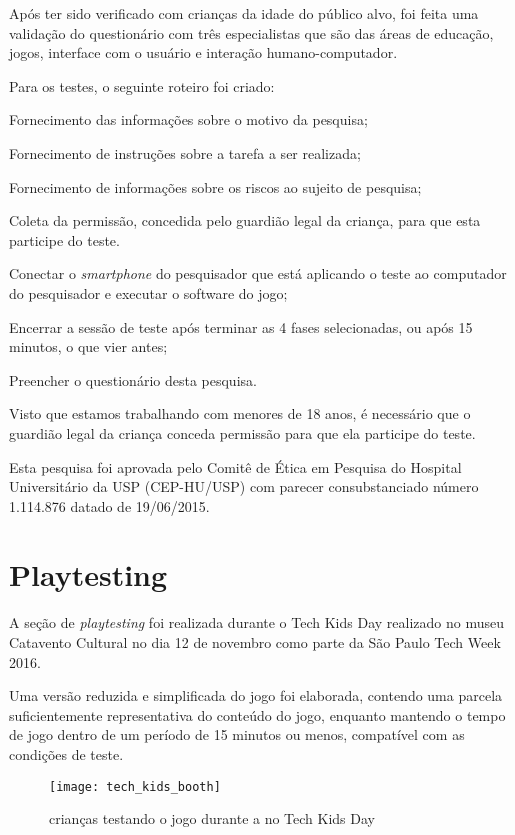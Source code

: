 Após ter sido verificado com crianças da idade do público alvo, foi feita uma validação do questionário com três especialistas que são das áreas de educação, jogos, interface com o usuário e interação humano-computador.

Para os testes, o seguinte roteiro foi criado:

\begin{alineas}
	\item Fornecimento das informações sobre o motivo da pesquisa;
	\item Fornecimento de instruções sobre a tarefa a ser realizada;
	\item Fornecimento de informações sobre os riscos ao sujeito de pesquisa;
	\item Coleta da permissão, concedida pelo guardião legal da criança, para que esta participe do teste.
	\item Conectar o \textit{smartphone} do pesquisador que está aplicando o teste ao computador do pesquisador e executar o software do jogo; 
	\item Encerrar a sessão de teste após terminar as 4 fases selecionadas, ou após 15 minutos, o que vier antes;
	\item Preencher o questionário desta pesquisa.
\end{alineas}

Visto que estamos trabalhando com menores de 18 anos, é necessário que o guardião legal da criança conceda permissão para que ela participe do teste.	

Esta pesquisa foi aprovada pelo Comitê de Ética em Pesquisa do Hospital Universitário da USP (CEP-HU/USP) com parecer consubstanciado número 1.114.876 datado de 19/06/2015.

\section{Playtesting}\label{sec-playtesting}

A seção de \textit{playtesting} foi realizada durante o Tech Kids Day 
realizado no museu Catavento Cultural no dia 12 de novembro como parte 
da São Paulo Tech Week 2016. 

Uma versão reduzida e simplificada do jogo foi elaborada, contendo uma 
parcela suficientemente representativa do conteúdo do jogo, enquanto 
mantendo o tempo de jogo dentro de um período de 15 minutos ou menos, 
compatível com as condições de teste.

\begin{figure}[h]
	\centering
	\caption{crianças testando o jogo durante a no Tech Kids Day}
	\texttt{[image: tech\_kids\_booth]}
	\legend{\fonteAP}
	\label{fig:tech-kids-day}
\end{figure}

